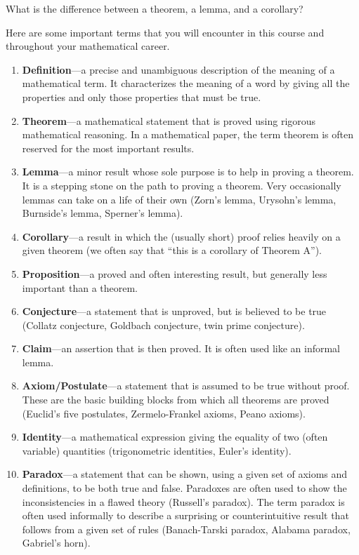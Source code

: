 \appendix
\begin{chapter}{What is the difference between a theorem, a lemma, and a corollary?}
\label{appendix:difference}

Here are some important terms that you will encounter in this course and throughout your mathematical career.

\begin{enumerate}
\item
\textbf{Definition}---a precise and unambiguous description of the meaning of a mathematical term.  It characterizes the meaning of a word by giving all the properties and only those properties that must be true.
\item
\textbf{Theorem}---a mathematical statement that is proved using rigorous mathematical reasoning.  In a mathematical paper, the term theorem is often reserved for the most important results.
\item
\textbf{Lemma}---a minor result whose sole purpose is to help in proving a theorem.  It is a stepping stone on the path to proving a theorem. Very occasionally lemmas can take on a life of their own (Zorn's lemma, Urysohn's lemma, Burnside's lemma, Sperner's lemma).
\item
\textbf{Corollary}---a result in which the (usually short) proof relies heavily on a given theorem (we often say that ``this is a corollary of Theorem A'').
\item
\textbf{Proposition}---a proved and often interesting result, but generally less important than a theorem.
\item
\textbf{Conjecture}---a statement that is unproved, but is believed to be true (Collatz conjecture, Goldbach conjecture, twin prime conjecture).
\item
\textbf{Claim}---an assertion that is then proved.  It is often used like an informal lemma.
\item
\textbf{Axiom/Postulate}---a statement that is assumed to be true without proof. These are the basic building blocks from which all theorems are proved (Euclid's five postulates, Zermelo-Frankel axioms, Peano axioms).
\item
\textbf{Identity}---a mathematical expression giving the equality of two (often variable) quantities (trigonometric identities, Euler's identity).
\item
\textbf{Paradox}---a statement that can be shown, using a given set of axioms and definitions, to be both true and false. Paradoxes are often used to show the inconsistencies in a flawed theory (Russell's paradox).  The term paradox is often used informally to describe a surprising or counterintuitive result that follows from a given set of rules (Banach-Tarski paradox, Alabama paradox, Gabriel's horn).
\end{enumerate}

\end{chapter}